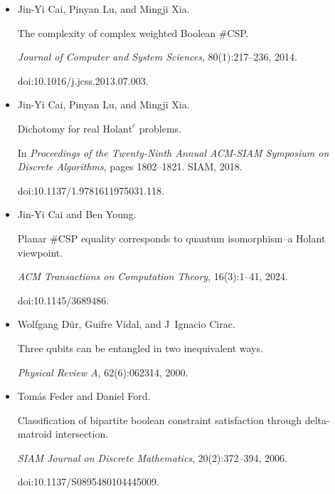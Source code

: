 \begin{itemize}
\item[] 
[16]

Jin-Yi Cai, Pinyan Lu, and Mingji Xia.


The complexity of complex weighted Boolean \#CSP.


\emph{Journal of Computer and System Sciences}, 80(1):217–236, 2014.


doi:10.1016/j.jcss.2013.07.003.





\item[] 
[17]

Jin-Yi Cai, Pinyan Lu, and Mingji Xia.


Dichotomy for real $\text{Holant}^{c}$ problems.


In \emph{Proceedings of the Twenty-Ninth Annual ACM-SIAM Symposium on
Discrete Algorithms}, pages 1802–1821. SIAM, 2018.


doi:10.1137/1.9781611975031.118.





\item[] 
[18]

Jin-Yi Cai and Ben Young.


Planar \#CSP equality corresponds to quantum isomorphism–a
Holant viewpoint.


\emph{ACM Transactions on Computation Theory}, 16(3):1–41, 2024.


doi:10.1145/3689486.





\item[] 
[19]

Wolfgang Dür, Guifre Vidal, and J Ignacio Cirac.


Three qubits can be entangled in two inequivalent ways.


\emph{Physical Review A}, 62(6):062314, 2000.





\item[] 
[20]

Tomás Feder and Daniel Ford.


Classification of bipartite boolean constraint satisfaction through
delta-matroid intersection.


\emph{SIAM Journal on Discrete Mathematics}, 20(2):372–394, 2006.


doi:10.1137/S0895480104445009.






\end{itemize}
